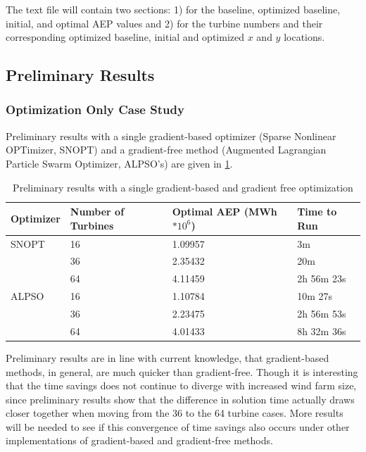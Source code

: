 \documentclass[]{aiaa-tc}
\begin{document}
The text file will contain two sections: 1) for the baseline, optimized baseline, initial, and  optimal AEP values and 2) for the turbine numbers and their corresponding optimized baseline, initial and optimized $x$ and $y$ locations.




\begin{centering}
	\section{Preliminary Results}
\end{centering}

\subsubsection{Optimization Only Case Study}

Preliminary results with a single gradient-based optimizer (Sparse Nonlinear OPTimizer, SNOPT) and a gradient-free method (Augmented Lagrangian Particle Swarm Optimizer, ALPSO's) are given in \cref{tab:OptOnlyPrelim}.

\begin{table}[]
	\begin{center}
		\begin{tabular}{|l|p{1.7cm}|p{2cm}|l|}
			\hline
			Optimizer & Number of Turbines & Optimal AEP (MWh$*10^6$) & Time to Run \\
			\hline
			\hline
			SNOPT     & 16                 & 1.09957                  & 3m          \\
			          & 36                 & 2.35432                  & 20m         \\
			          & 64                 & 4.11459                  & 2h 56m 23s  \\
			\hline
			ALPSO     & 16                 & 1.10784                  & 10m 27s     \\
			          & 36                 & 2.23475                  & 2h 56m 53s  \\
			          & 64                 & 4.01433                  & 8h 32m 36s  \\
			\hline
		\end{tabular}
	\end{center}
	\caption{Preliminary results with a single gradient-based and gradient free optimization}
	\label{tab:OptOnlyPrelim}
\end{table}

Preliminary results are in line with current knowledge, that gradient-based methods, in general, are much quicker than gradient-free. Though it is interesting that the time savings does not continue to diverge with increased wind farm size, since preliminary results show that the difference in solution time actually draws closer together when moving from the 36 to the 64 turbine cases. More results will be needed to see if this convergence of time savings also occurs under other implementations of gradient-based and gradient-free methods.
\end{document}
